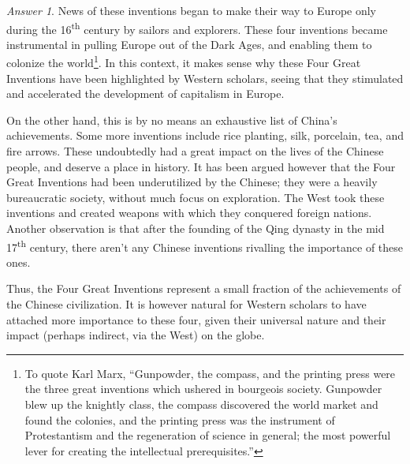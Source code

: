 \documentclass[11pt]{article}
\theoremstyle{remark}
\newtheorem*{answer}{Answer}
\begin{document}
\begin{answer}
        News of these inventions began to make their way to Europe only during the
        16\textsuperscript{th} century by sailors and explorers. These four
        inventions became instrumental in pulling Europe out of the Dark Ages, and
        enabling them to colonize the world\footnote{To quote Karl Marx, ``Gunpowder,
        the compass, and the printing press were the three great inventions which
        ushered in bourgeois society. Gunpowder blew up the knightly class, the
        compass discovered the world market and found the colonies, and the printing
        press was the instrument of Protestantism and the regeneration of science in
        general; the most powerful lever for creating the intellectual
        prerequisites.''}. In this context, it makes sense why these Four Great
        Inventions have been highlighted by Western scholars, seeing that they
        stimulated and accelerated the development of capitalism in Europe.

        On the other hand, this is by no means an exhaustive list of China's
        achievements. Some more inventions include rice planting, silk,
        porcelain, tea, and fire arrows. These undoubtedly had a great impact on the
        lives of the Chinese people, and deserve a place in history. It has been
        argued however that the Four Great Inventions had been underutilized by the
        Chinese; they were a heavily bureaucratic society, without much focus on
        exploration. The West took these inventions and created weapons with which
        they conquered foreign nations. Another observation is that after the
        founding of the Qing dynasty in the mid 17\textsuperscript{th} century, there
        aren't any Chinese inventions rivalling the importance of these ones.

        Thus, the Four Great Inventions represent a small fraction of the
        achievements of the Chinese civilization. It is however natural for Western
        scholars to have attached more importance to these four, given their
        universal nature and their impact (perhaps indirect, via the West) on the
        globe.
    \end{answer}
\end{document}
